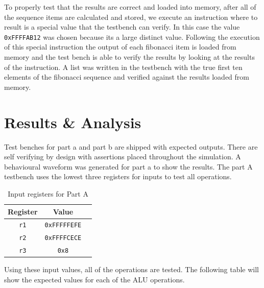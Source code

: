 \documentclass[CMPE]{../KGCOEReport}
\def\code#1{\texttt{#1}}
\begin{document}
	To properly test that the results are correct and loaded into memory,
	after all of the sequence items are calculated and stored, we execute
	an instruction where to result is a special value that the testbench can
	verify. In this case the value \code{0xFFFFAB12} was chosen because its
	a large distinct value. Following the execution of this special instruction
	the output of each fibonacci item is loaded from memory and the test bench
	is able to verify the results by looking at the results of the instruction.
	A list was written in the testbench with the true first ten elements of the
	fibonacci sequence and verified against the results loaded from memory.
	
	\pagebreak
	
    \section*{Results \& Analysis}

    Test benches for part a and part b are shipped with expected outputs.
    There are self verifying by design with assertions placed throughout
    the simulation. A behavioural waveform was generated for part a to show
    the results. The part A testbench uses the lowest three registers for 
    inputs to test all operations.
	
	\begin{table}[H]
        \renewcommand{\arraystretch}{1.2}
        \setlength{\tabcolsep}{12pt}
        \caption{Input registers for Part A}
        \begin{center}
            \begin{tabular}{|c|c|c|}
                \hline
				Register & Value\\\hline

				\code{r1} & \code{0xFFFFFEFE}\\\hline
				\code{r2} & \code{0xFFFFCECE}\\\hline
				\code{r3} & \code{0x8}\\\hline

            \end{tabular}
        \end{center}
        \label{tab:inputs}
    \end{table}

	Using these input values, all of the operations are tested. The
	following table will show the expected values for each of the ALU
	operations.
    
\end{document}
